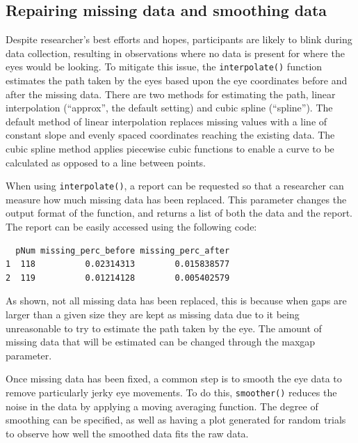 \documentclass[
  man,
  floatsintext,
  longtable,
  nolmodern,
  notxfonts,
  notimes,
  colorlinks=true,linkcolor=blue,citecolor=blue,urlcolor=blue]{apa7}
\begin{document}
\subsection{Repairing missing data and smoothing
data}\label{repairing-missing-data-and-smoothing-data}

Despite researcher's best efforts and hopes, participants are likely to
blink during data collection, resulting in observations where no data is
present for where the eyes would be looking. To mitigate this issue, the
\texttt{interpolate()} function estimates the path taken by the eyes
based upon the eye coordinates before and after the missing data. There
are two methods for estimating the path, linear interpolation
(``approx'', the default setting) and cubic spline (``spline''). The
default method of linear interpolation replaces missing values with a
line of constant slope and evenly spaced coordinates reaching the
existing data. The cubic spline method applies piecewise cubic functions
to enable a curve to be calculated as opposed to a line between points.

When using \texttt{interpolate()}, a report can be requested so that a
researcher can measure how much missing data has been replaced. This
parameter changes the output format of the function, and returns a list
of both the data and the report. The report can be easily accessed using
the following code:

\begin{verbatim}
  pNum missing_perc_before missing_perc_after
1  118          0.02314313        0.015838577
2  119          0.01214128        0.005402579
\end{verbatim}

As shown, not all missing data has been replaced, this is because when
gaps are larger than a given size they are kept as missing data due to
it being unreasonable to try to estimate the path taken by the eye. The
amount of missing data that will be estimated can be changed through the
maxgap parameter.

Once missing data has been fixed, a common step is to smooth the eye
data to remove particularly jerky eye movements. To do this,
\texttt{smoother()} reduces the noise in the data by applying a moving
averaging function. The degree of smoothing can be specified, as well as
having a plot generated for random trials to observe how well the
smoothed data fits the raw data.
\end{document}

